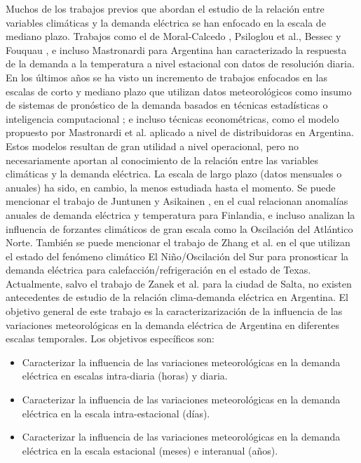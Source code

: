 \documentclass[11pt,a4paper]{article}
\begin{document}
Muchos de los trabajos previos que abordan el estudio de la relación entre variables climáticas y la demanda eléctrica se han enfocado en la escala de mediano plazo. Trabajos como el de Moral-Calcedo , Psiloglou et al., Bessec y Fouquau \cite{moral2005modelling,psiloglou2009factors,bessec2008non}, e incluso Mastronardi para Argentina \cite{detemperatura} han caracterizado la respuesta de la demanda a la temperatura a nivel estacional con datos de resolución diaria. En los últimos años se ha visto un incremento de trabajos enfocados en las escalas de corto y mediano plazo que utilizan datos meteorológicos como insumo de sistemas de pronóstico de la demanda basados en técnicas estadísticas o inteligencia computacional \cite{zanek2022definicion, hor2006daily, son2017short, lis2023short}; e incluso técnicas econométricas, como el modelo propuesto por Mastronardi et al. \cite{detemperatura} aplicado a nivel de distribuidoras en Argentina. Estos modelos resultan de gran utilidad a nivel operacional, pero no necesariamente aportan al conocimiento de la relación entre las variables climáticas y la demanda eléctrica. La escala de largo plazo (datos mensuales o anuales) ha sido, en cambio, la menos estudiada hasta el momento. Se puede mencionar el trabajo de Juntunen y Asikainen \cite{juntunen2023electricity}, en el cual relacionan anomalías anuales de demanda eléctrica y temperatura para Finlandia, e incluso analizan la influencia de forzantes climáticos de gran escala como la Oscilación del Atlántico Norte. También se puede mencionar el trabajo de Zhang et al. \cite{zhang2024potential} en el que utilizan el estado del fenómeno climático El Niño/Oscilación del Sur para pronosticar la demanda eléctrica para calefacción/refrigeración en el estado de Texas. Actualmente, salvo el trabajo de Zanek et al. \cite{zanek2022definicion} para la ciudad de Salta, no existen antecedentes de estudio de la relación clima-demanda eléctrica en Argentina. El objetivo general de este trabajo es la caracterizarización de la influencia de las variaciones meteorológicas en la demanda eléctrica de Argentina en diferentes escalas temporales. Los objetivos específicos son:

\begin{itemize}
	\item Caracterizar la influencia de las variaciones meteorológicas en la demanda eléctrica en escalas intra-diaria (horas) y diaria.
	\item   Caracterizar la influencia de las variaciones meteorológicas en la demanda eléctrica en la escala intra-estacional (días).
	\item   Caracterizar la influencia de las variaciones meteorológicas en la demanda eléctrica en la escala estacional (meses) e interanual (años).
\end{itemize}
\end{document}

